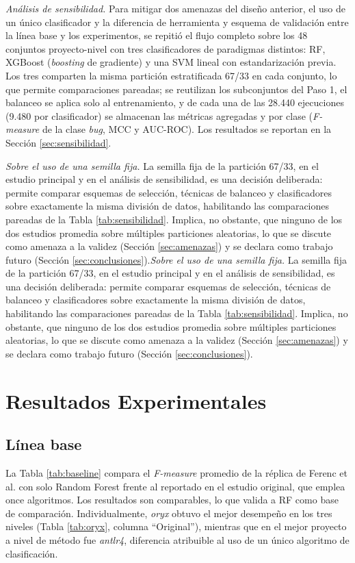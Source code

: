 \documentclass[conference,a4paper]{IEEEtran}
\newif\ifmarcarcambios
\newcommand{\cambio}[1]{\ifmarcarcambios\ifvmode\leavevmode\fi{\color{azulcambio}#1}\else#1\fi}
\begin{document}
\textit{Análisis de sensibilidad.} Para mitigar dos amenazas del diseño anterior, el uso de un único clasificador y la diferencia de herramienta y esquema de validación entre la línea base y los experimentos, se repitió el flujo completo sobre los 48 conjuntos proyecto-nivel con tres clasificadores de paradigmas distintos: RF, XGBoost \cite{chen2016} (\textit{boosting} de gradiente) y una SVM lineal \cite{cortes1995} con estandarización previa. Los tres comparten la misma partición estratificada 67/33 en cada conjunto, lo que permite comparaciones pareadas; se reutilizan los subconjuntos del Paso 1, el balanceo se aplica solo al entrenamiento, y de cada una de las 28.440 ejecuciones (9.480 por clasificador) se almacenan las métricas agregadas y por clase (\textit{F-measure} de la clase \textit{bug}, MCC y AUC-ROC). Los resultados se reportan en la Sección \ref{sec:sensibilidad}.

\cambio{\textit{Sobre el uso de una semilla fija.} La semilla fija de la partición 67/33, en el estudio principal y en el análisis de sensibilidad, es una decisión deliberada: permite comparar esquemas de selección, técnicas de balanceo y clasificadores sobre exactamente la misma división de datos, habilitando las comparaciones pareadas de la Tabla \ref{tab:sensibilidad}. Implica, no obstante, que ninguno de los dos estudios promedia sobre múltiples particiones aleatorias, lo que se discute como amenaza a la validez (Sección \ref{sec:amenazas}) y se declara como trabajo futuro (Sección \ref{sec:conclusiones}).}

\section{Resultados Experimentales}

\subsection{Línea base}
\label{sec:baseline}

La Tabla \ref{tab:baseline} compara el \textit{F-measure} promedio de la réplica de Ferenc et al. \cite{ferenc2020} con solo Random Forest frente al reportado en el estudio original, que emplea once algoritmos. Los resultados son comparables, lo que valida a RF como base de comparación. Individualmente, \textit{oryx} obtuvo el mejor desempeño en los tres niveles (Tabla \ref{tab:oryx}, columna ``Original''), mientras que en \cite{ferenc2020} el mejor proyecto a nivel de método fue \textit{antlr4}, diferencia atribuible al uso de un único algoritmo de clasificación.
\end{document}
